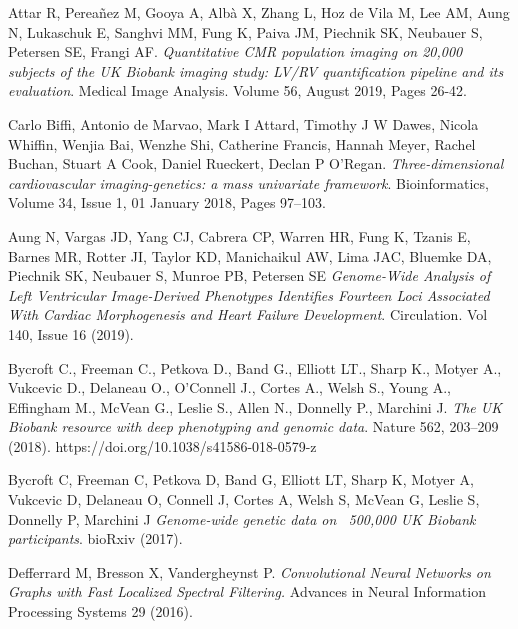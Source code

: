 \documentclass[twocolumn]{llncs}
\begin{document}
\begin{thebibliography}{8}
Attar R, Perea\~nez M, Gooya A, Albà X, Zhang L, Hoz de Vila M, Lee AM, Aung N, Lukaschuk E, Sanghvi MM, Fung K, Paiva JM, Piechnik SK, Neubauer S, Petersen SE, Frangi AF. \textit{Quantitative CMR population imaging on 20,000 subjects of the UK Biobank imaging study: LV/RV quantification pipeline and its evaluation}. Medical Image Analysis. Volume 56, August 2019, Pages 26-42.

Carlo Biffi, Antonio de Marvao, Mark I Attard, Timothy J W Dawes, Nicola Whiffin, Wenjia Bai, Wenzhe Shi, Catherine Francis, Hannah Meyer, Rachel Buchan, Stuart A Cook, Daniel Rueckert, Declan P O’Regan. \textit{Three-dimensional cardiovascular imaging-genetics: a mass univariate framework}. Bioinformatics, Volume 34, Issue 1, 01 January 2018, Pages 97–103.


Aung N, Vargas JD, Yang CJ, Cabrera CP, Warren HR, Fung K, Tzanis E, Barnes MR, Rotter JI, Taylor KD, Manichaikul AW, Lima JAC, Bluemke DA, Piechnik SK, Neubauer S, Munroe PB, Petersen SE
\textit{Genome-Wide Analysis of Left Ventricular Image-Derived Phenotypes Identifies Fourteen Loci Associated With Cardiac Morphogenesis and Heart Failure Development}. Circulation. Vol 140, Issue 16 (2019).


Bycroft C., Freeman C., Petkova D., Band G., Elliott LT., Sharp K., Motyer A., Vukcevic D., Delaneau O., O’Connell J., Cortes A., Welsh S., Young A., Effingham M., McVean G., Leslie S., Allen N., Donnelly P., Marchini J. \textit{The UK Biobank resource with deep phenotyping and genomic data}. Nature 562, 203–209 (2018). https://doi.org/10.1038/s41586-018-0579-z


Bycroft C, Freeman C, Petkova D, Band G, Elliott LT, Sharp K, Motyer A, Vukcevic D, Delaneau O, Connell J, Cortes A, Welsh S, McVean G, Leslie S, Donnelly P, Marchini J
\textit{Genome-wide genetic data on ~500,000 UK Biobank participants}. bioRxiv (2017).

Defferrard M, Bresson X, Vandergheynst P. \textit{Convolutional Neural Networks on Graphs with Fast Localized Spectral Filtering.} Advances in Neural Information Processing Systems 29 (2016). 



\end{thebibliography}
\end{document}
